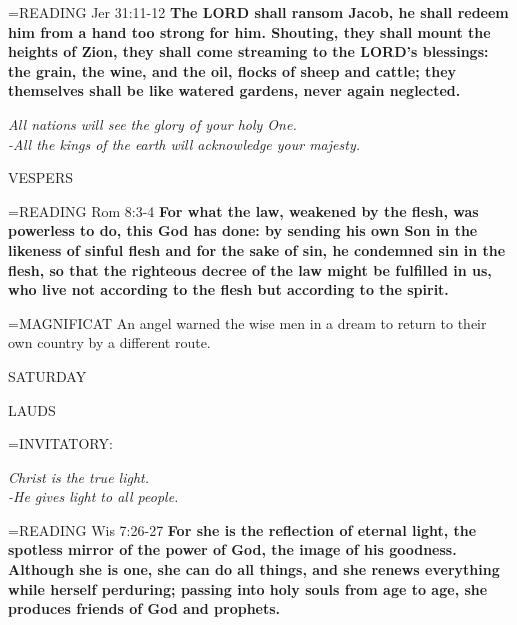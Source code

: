 \hangindent=\parindent \small{READING}   Jer 31:11-12 \textbf{  The LORD shall ransom Jacob, he shall redeem him from a hand too strong for him. Shouting, they shall mount the heights of Zion, they shall come streaming to the LORD’s blessings: the grain, the wine, and the oil, flocks of sheep and cattle; they themselves shall be like watered gardens, never again neglected.}

\begin{center}
\textit{All nations will see the glory of your holy One.\\
-All the kings of the earth will acknowledge your majesty.}
\end{center}

\begin{flushleft}\normalsize VESPERS\\\end{flushleft}

\hangindent=\parindent \small{READING}   Rom 8:3-4 \textbf{  For what the law, weakened by the flesh, was powerless to do, this God has done: by sending his own Son in the likeness of sinful flesh and for the sake of sin, he condemned sin in the flesh, so that the righteous decree of the law might be fulfilled in us, who live not according to the flesh but according to the spirit.\\}

\hangindent=\parindent \small{MAGNIFICAT 	An angel warned the wise men in a dream to return to their own country by a different route.\\}

\begin{center}
\normalsize SATURDAY
\end{center}

\begin{flushleft}\normalsize LAUDS\\\end{flushleft}

\hangindent=\parindent \small{INVITATORY:}
\begin{center}
\textit{Christ is the true light.\\}
\textit{-He gives light to all people.\\}
\end{center}

\hangindent=\parindent \small{READING}   Wis 7:26-27 \textbf{  For she is the reflection of eternal light, the spotless mirror of the power of God, the image of his goodness. Although she is one, she can do all things, and she renews everything while herself perduring; passing into holy souls from age to age, she produces friends of God and prophets.\\}

